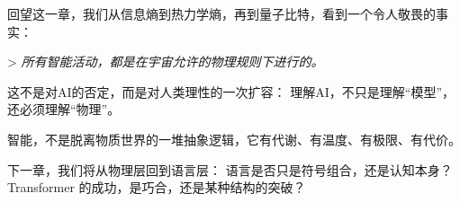 回望这一章，我们从信息熵到热力学熵，再到量子比特，看到一个令人敬畏的事实：

> \textit{所有智能活动，都是在宇宙允许的物理规则下进行的。}

这不是对AI的否定，而是对人类理性的一次扩容：  
理解AI，不只是理解“模型”，还必须理解“物理”。

智能，不是脱离物质世界的一堆抽象逻辑，它有代谢、有温度、有极限、有代价。

下一章，我们将从物理层回到语言层：  
语言是否只是符号组合，还是认知本身？Transformer 的成功，是巧合，还是某种结构的突破？


\nocite{*}
\printbibliography[heading=bibintoc, title=\ebibname]
\appendix

\newpage
